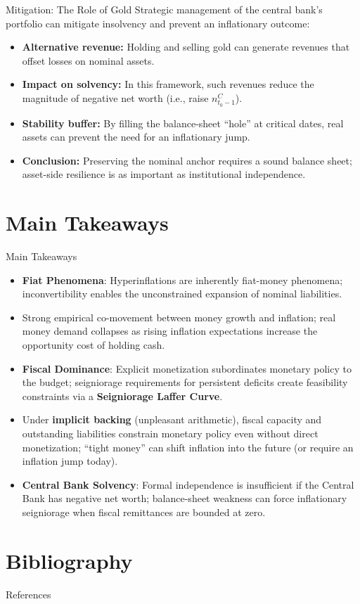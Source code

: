 \documentclass[11pt,aspectratio=169]{beamer}
\begin{document}
\begin{frame}{Mitigation: The Role of Gold}
\small
Strategic management of the central bank’s portfolio can mitigate insolvency and prevent an inflationary outcome:

\begin{itemize}
    \item \textbf{Alternative revenue:} Holding and selling gold can generate revenues that offset losses on nominal assets.
    \item \textbf{Impact on solvency:} In this framework, such revenues reduce the magnitude of negative net worth (i.e., raise \(n_{t_{0}-1}^{C}\)).
    \item \textbf{Stability buffer:} By filling the balance-sheet \enquote{hole} at critical dates, real assets can prevent the need for an inflationary jump.
    \item \textbf{Conclusion:} Preserving the nominal anchor requires a sound balance sheet; asset-side resilience is as important as institutional independence.
\end{itemize}
\end{frame}


\section{Main Takeaways}
\begin{frame}{Main Takeaways}
\small
\begin{itemize}
  \item \textbf{Fiat Phenomena}: Hyperinflations are inherently fiat-money phenomena; inconvertibility enables the unconstrained expansion of nominal liabilities.
  \item Strong empirical co-movement between money growth and inflation; real money demand collapses as rising inflation expectations increase the opportunity cost of holding cash.
  \item \textbf{Fiscal Dominance}: Explicit monetization subordinates monetary policy to the budget; seigniorage requirements for persistent deficits create feasibility constraints via a \textbf{Seigniorage Laffer Curve}.
  \item Under \textbf{implicit backing} (unpleasant arithmetic), fiscal capacity and outstanding liabilities constrain monetary policy even without direct monetization; ``tight money'' can shift inflation into the future (or require an inflation jump today).
  \item \textbf{Central Bank Solvency}: Formal independence is insufficient if the Central Bank has negative net worth; balance-sheet weakness can force inflationary seigniorage when fiscal remittances are bounded at zero.
\end{itemize}
\end{frame}

\section{Bibliography}

\begin{frame}[allowframebreaks]{References}
\printbibliography
\end{frame}
\end{document}
